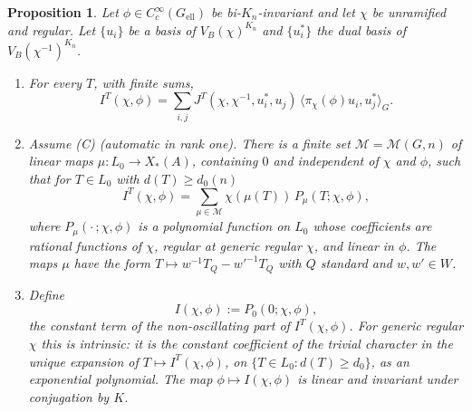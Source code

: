 \documentclass[12pt,letterpaper]{article}
\numberwithin{equation}{section}
\theoremstyle{plain}
\newtheorem{proposition}[lemma]{Proposition}
\theoremstyle{remark}
\theoremstyle{plain}
\theoremstyle{definition}
\theoremstyle{remark}
\theoremstyle{remark}
\newcommand{\ip}[1]{\langle #1\rangle}
\newcommand{\ellr}{\mathrm{ell}}
\begin{document}
\begin{proposition}\label{prop:4.2}
Let $\phi\in C_c^\infty(G_{\ellr})$ be bi-$K_n$-invariant and let $\chi$ be unramified and regular. Let $\{u_i\}$ be a basis of $V_B(\chi)^{K_n}$ and $\{u_i^*\}$ the dual basis of $V_B(\chi^{-1})^{K_n}$.
\begin{enumerate}[label=(\alph*)]
\item For every $T$, with finite sums,
\setcounter{equation}{6}\begin{equation}\label{eq:4.7}
I^T(\chi,\phi)=\sum_{i,j}J^T(\chi,\chi^{-1},u_i^*,u_j)\,\ip{\pi_\chi(\phi)u_i,u_j^*}_G.
\end{equation}
\item Assume (C) (automatic in rank one). There is a finite set $\mathcal M=\mathcal M(G,n)$ of linear maps $\mu:L_0\to X_*(A)$, containing $0$ and independent of $\chi$ and $\phi$, such that for $T\in L_0$ with $d(T)\ge d_0(n)$
\begin{equation}\tag{4.7A}\label{eq:4.7A}
I^T(\chi,\phi)=\sum_{\mu\in\mathcal M}\chi(\mu(T))\,P_\mu(T;\chi,\phi),
\end{equation}
where $P_\mu(\cdot\,;\chi,\phi)$ is a polynomial function on $L_0$ whose coefficients are rational functions of $\chi$, regular at generic regular $\chi$, and linear in $\phi$. The maps $\mu$ have the form $T\mapsto w^{-1}T_Q-w'^{-1}T_Q$ with $Q$ standard and $w,w'\in W$.
\item Define
\[
I(\chi,\phi):=P_0(0;\chi,\phi),
\]
the constant term of the non-oscillating part of $I^T(\chi,\phi)$. For generic regular $\chi$ this is intrinsic: it is the constant coefficient of the trivial character in the unique expansion of $T\mapsto I^T(\chi,\phi)$, on $\{T\in L_0:d(T)\ge d_0\}$, as an exponential polynomial. The map $\phi\mapsto I(\chi,\phi)$ is linear and invariant under conjugation by $K$.
\end{enumerate}
\end{proposition}
\end{document}
